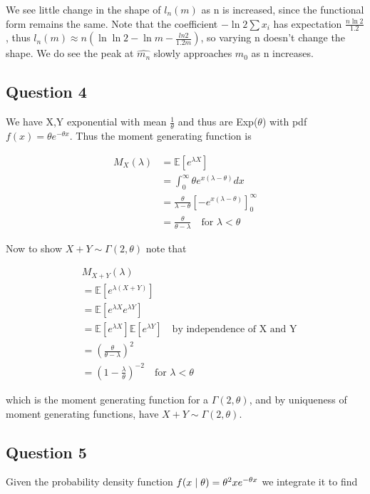 \documentclass[10pt,a4paper]{report}
\begin{document}
We see little change in the shape of $l_n(m)$ as n is increased, since the functional form remains the same. Note that the coefficient $-\ln2\sum x_i$ has expectation $\frac{n\ln2}{1.2}$, thus $l_n(m)\approx n( \ln\ln 2-\ln m - \frac{ln2}{1.2m})$, so varying n doesn't change the shape. We do see the peak at $\hat{m_n}$ slowly approaches $m_0$ as n increases.

\subsection*{Question 4}

We have X,Y exponential with mean $\frac{1}{\theta}$ and thus are Exp($\theta$) with pdf $f(x)=\theta e^{-\theta x}$. Thus the moment generating function is

\begin{align*}
M_X(\lambda)&=\mathbb{E}[e^{\lambda X}]\\
&=\int_0^\infty \theta e^{x(\lambda - \theta)}dx\\
&=\frac{\theta}{\lambda-\theta}\left[-e^{x(\lambda-\theta)}\right]_0^\infty\\
&=\frac{\theta}{\theta-\lambda} \quad \text{for $\lambda<\theta$}
\end{align*}

Now to show $X+Y \sim \Gamma(2,\theta)$ note that

\begin{align*}
&M_{X+Y}(\lambda)\\
&=\mathbb{E}[e^{\lambda (X+Y)}]\\
&=\mathbb{E}[e^{\lambda X}e^{\lambda Y}]\\
&=\mathbb{E}[e^{\lambda X}]\mathbb{E}[e^{\lambda Y}] \quad \text{by independence of X and Y}\\
&=(\frac{\theta}{\theta-\lambda})^2\\
&=(1-\frac{\lambda}{\theta})^{-2} \quad \text{for $\lambda<\theta$}
\end{align*}

which is the moment generating function for a $\Gamma(2,\theta)$, and by uniqueness of moment generating functions, have  $X+Y \sim \Gamma(2,\theta)$.


\subsection*{Question 5}

Given the probability density function $f(x \hspace{1mm}| \hspace{1mm} \theta) = \theta^2xe^{-\theta x}$ we integrate it to find
\end{document}
